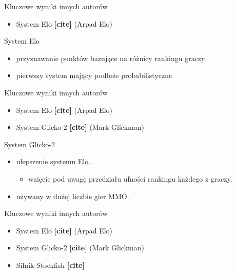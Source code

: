 \documentclass{beamer}
\begin{document}
\begin{frame}{Kluczowe wyniki innych autorów}
	\begin{itemize}
		\item System Elo \textbf{[cite]} (Arpad Elo)
	\end{itemize}
\end{frame}

\begin{frame}{System Elo}
	\begin{itemize}
		\item przyznawanie punktów bazujące na różnicy rankingu graczy
		\item pierwszy system mający podłoże probabilistyczne
	\end{itemize}
\end{frame}

\begin{frame}{Kluczowe wyniki innych autorów}
	\begin{itemize}
		\item System Elo \textbf{[cite]} (Arpad Elo)
		\item System Glicko-2 \textbf{[cite]} (Mark Glickman)
	\end{itemize}
\end{frame}

\begin{frame}{System Glicko-2}
	\begin{itemize}
		\item ulepszenie systemu Elo.
		\begin{itemize}
			\item wzięcie pod uwagę przedziału ufności rankingu każdego z graczy.
		\end{itemize}
		\item używany w dużej liczbie gier MMO.
	\end{itemize}
\end{frame}

\begin{frame}{Kluczowe wyniki innych autorów}
	\begin{itemize}
		\item System Elo \textbf{[cite]} (Arpad Elo)
		\item System Glicko-2 \textbf{[cite]} (Mark Glickman)
		\item Silnik Stockfish \textbf{[cite]}
	\end{itemize}
\end{frame}
\end{document}
